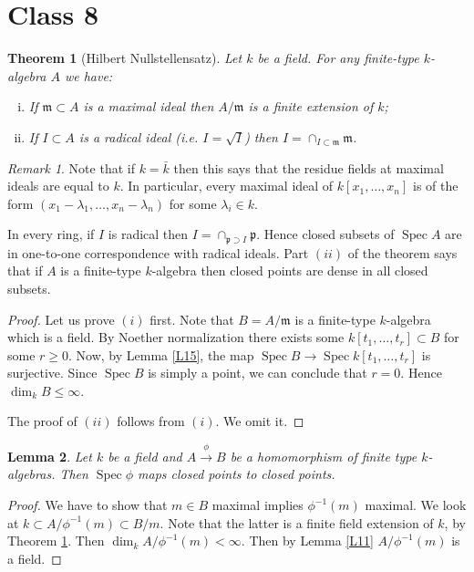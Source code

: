 \documentclass{article}
\newcommand{\fr}{\mathfrak}
\DeclareMathOperator{\Spec}{Spec}
\theoremstyle{plain}
\newtheorem{thm}{Theorem}
\newtheorem{lem}[thm]{Lemma}
\theoremstyle{definition}
\theoremstyle{remark}
\newtheorem*{rem}{Remark}
\begin{document}
\section*{Class 8}

\begin{thm}[Hilbert Nullstellensatz]
\label{L48}
Let $k$ be a field. For any finite-type $k$-algebra $A$ we have:
\begin{enumerate}[(i)]
\item If $\fr m\subset A$ is a maximal ideal then $A/\fr m$ is a finite extension of $k$;
\item If $I\subset A$ is a radical ideal (i.e. $I=\sqrt{I}$) then $I=\cap_{I\subset\fr m}\fr m$.
\end{enumerate}
\end{thm}

\begin{rem}
Note that if $k=\bar k$ then this says that the residue fields at maximal ideals are equal to $k$. In particular, every maximal ideal of $k[x_1,\ldots,x_n]$ is of the form $(x_1-\lambda_1,\ldots,x_n-\lambda_n)$ for some $\lambda_i\in k$.

In every ring, if $I$ is radical then $I=\cap_{\fr p\supset I}\fr p$. Hence closed subsets of $\Spec A$ are in one-to-one correspondence with radical ideals. Part $(ii)$ of the theorem says that if $A$ is a finite-type $k$-algebra then closed points are dense in all closed subsets.
\end{rem}

\begin{proof}
Let us prove $(i)$ first. Note that $B=A/\fr m$ is a finite-type $k$-algebra which is a field. By Noether normalization there exists some $k[t_1,\ldots,t_r]\subset B$ for some $r\geq 0$. Now, by Lemma \ref{L15}, the map $\Spec B\to\Spec k[t_1,\ldots, t_r]$ is surjective. Since $\Spec B$ is simply a point, we can conclude that $r=0$. Hence $\dim_k B\leq\infty$.

The proof of $(ii)$ follows from $(i)$. We omit it.
\end{proof}

\begin{lem}
\label{L49}
Let $k$ be a field and $A \overset{\phi}{\to} B$ be a homomorphism of finite type $k$-algebras. Then $\Spec \phi$ maps closed points to closed points.
\end{lem}

\begin{proof}
We have to show that $m\in B$ maximal implies $\phi^{-1}(m)$ maximal. We look at $k \subset A/\phi^{-1}(m) \subset B/m$. Note that the latter is a finite field extension of $k$, by Theorem \ref{L48}. Then $\dim_k A/\phi^{-1}(m) < \infty$. Then by Lemma \ref{L11} $A/\phi^{-1}(m)$ is a field. 
\end{proof}
\end{document}
